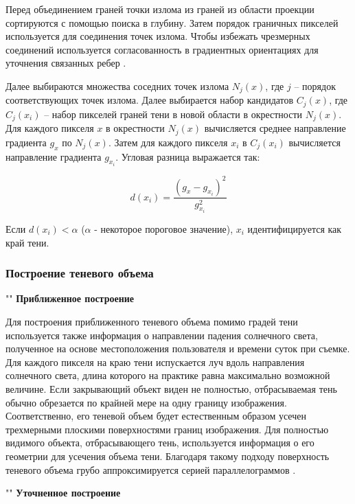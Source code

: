 Перед объединением граней точки излома из граней из области проекции сортируются с помощью поиска в глубину. Затем порядок граничных пикселей используется для соединения точек излома. Чтобы избежать чрезмерных соединений используется согласованность в градиентных ориентациях для уточнения связанных ребер \cite{wei2019simulating}.

Далее выбираются множества соседних точек излома $N_j(x)$, где $j$ -- порядок соответствующих точек излома. Далее выбирается набор кандидатов $C_j(x)$, где $C_j(x_i)$ -- набор пикселей граней тени в новой области в окрестности $N_j(x)$. Для каждого пикселя $x$ в окрестности $N_j(x)$ вычисляется среднее направление градиента $g_x$ по $N_j(x)$. Затем для каждого пикселя $x_i$ в $C_j(x_i)$ вычисляется направление градиента $g_{x_i}$. Угловая разница выражается так:

\begin{equation}
	d(x_i) = \frac{(g_x - g_{x_i}) ^ 2}{g_{x_i} ^ 2}
\end{equation}

Если $d(x_i) < \alpha$ ($\alpha$ - некоторое пороговое значение), $x_i$ идентифицируется как край тени.

\subsubsection*{Построение теневого объема}

""\newline
\indent\textbf{Приближенное построение}

Для построения приближенного теневого объема помимо градей тени используется также информация о направлении падения солнечного света, полученное на основе местоположения пользователя и времени суток при съемке. Для каждого пикселя на краю тени испускается луч вдоль направления солнечного света, длина которого на практике равна максимально возможной величине. Если закрывающий объект виден не полностью, отбрасываемая тень обычно обрезается по крайней мере на одну границу изображения. Соответственно, его теневой объем будет естественным образом усечен трехмерными плоскими поверхностями границ изображения. Для полностью видимого объекта, отбрасывающего тень, используется информация о его геометрии для усечения объема тени. Благодаря такому подходу поверхность теневого объема грубо аппроксимируется серией параллелограммов \cite{wei2019simulating}.

""\newline
\indent\textbf{Уточненное построение}

